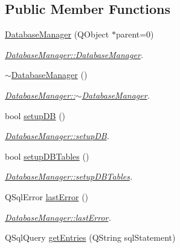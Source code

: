 \subsection*{Public Member Functions}
\begin{DoxyCompactItemize}
\item 
\hyperlink{class_database_manager_a957885a860c413d46e6c924c5573d89e}{Database\+Manager} (Q\+Object $\ast$parent=0)
\begin{DoxyCompactList}\small\item\em \hyperlink{class_database_manager_a957885a860c413d46e6c924c5573d89e}{Database\+Manager\+::\+Database\+Manager}. \end{DoxyCompactList}\item 
\hyperlink{class_database_manager_ae9b3a5da1e04fbb00faf8a034da1d063}{$\sim$\+Database\+Manager} ()
\begin{DoxyCompactList}\small\item\em \hyperlink{class_database_manager_ae9b3a5da1e04fbb00faf8a034da1d063}{Database\+Manager\+::$\sim$\+Database\+Manager}. \end{DoxyCompactList}\item 
bool \hyperlink{class_database_manager_a3cf904602c89c51b42ee4c66752a8989}{setup\+D\+B} ()
\begin{DoxyCompactList}\small\item\em \hyperlink{class_database_manager_a3cf904602c89c51b42ee4c66752a8989}{Database\+Manager\+::setup\+D\+B}. \end{DoxyCompactList}\item 
bool \hyperlink{class_database_manager_ad3d4a41b420d52c57a2ef4f19b031904}{setup\+D\+B\+Tables} ()
\begin{DoxyCompactList}\small\item\em \hyperlink{class_database_manager_ad3d4a41b420d52c57a2ef4f19b031904}{Database\+Manager\+::setup\+D\+B\+Tables}. \end{DoxyCompactList}\item 
Q\+Sql\+Error \hyperlink{class_database_manager_a0d786883976ea0f32e3566415138478d}{last\+Error} ()
\begin{DoxyCompactList}\small\item\em \hyperlink{class_database_manager_a0d786883976ea0f32e3566415138478d}{Database\+Manager\+::last\+Error}. \end{DoxyCompactList}\item 
Q\+Sql\+Query \hyperlink{class_database_manager_ae4cb8c8594da3342bc97a5ed325794c5}{get\+Entries} (Q\+String sql\+Statement)

\end{DoxyCompactItemize}

